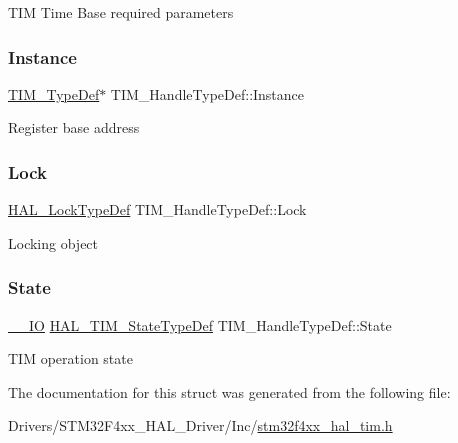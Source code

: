 T\+IM Time Base required parameters \mbox{\label{struct_t_i_m___handle_type_def_ad0c5f736a15f6d8d14724854c8133bcc}} 
\subsubsection{\texorpdfstring{Instance}{Instance}}
{\footnotesize\ttfamily \hyperlink{struct_t_i_m___type_def}{T\+I\+M\+\_\+\+Type\+Def}$\ast$ T\+I\+M\+\_\+\+Handle\+Type\+Def\+::\+Instance}

Register base address \mbox{\label{struct_t_i_m___handle_type_def_a2a24b963b57150ed2fb0f051cd87b65a}} 
\subsubsection{\texorpdfstring{Lock}{Lock}}
{\footnotesize\ttfamily \hyperlink{stm32f4xx__hal__def_8h_ab367482e943333a1299294eadaad284b}{H\+A\+L\+\_\+\+Lock\+Type\+Def} T\+I\+M\+\_\+\+Handle\+Type\+Def\+::\+Lock}

Locking object \mbox{\label{struct_t_i_m___handle_type_def_a6b6eeaf94f2e6e3d0a5bdac44adf21d6}} 
\subsubsection{\texorpdfstring{State}{State}}
{\footnotesize\ttfamily \hyperlink{core__sc300_8h_aec43007d9998a0a0e01faede4133d6be}{\+\_\+\+\_\+\+IO} \hyperlink{group___t_i_m___exported___types_gae0994cf5970e56ca4903e9151f40010c}{H\+A\+L\+\_\+\+T\+I\+M\+\_\+\+State\+Type\+Def} T\+I\+M\+\_\+\+Handle\+Type\+Def\+::\+State}

T\+IM operation state 

The documentation for this struct was generated from the following file\+:\begin{DoxyCompactItemize}
\item 
Drivers/\+S\+T\+M32\+F4xx\+\_\+\+H\+A\+L\+\_\+\+Driver/\+Inc/\hyperlink{stm32f4xx__hal__tim_8h}{stm32f4xx\+\_\+hal\+\_\+tim.\+h}\end{DoxyCompactItemize}
